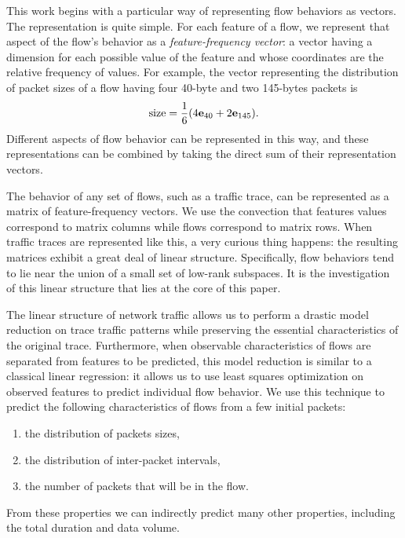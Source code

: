 \documentclass{acm_proc_article-sp}
\begin{document}
This work begins with a particular way of representing flow behaviors as vectors.
The representation is quite simple.
For each feature of a flow, we represent that aspect of the flow's behavior as a \emph{feature-frequency vector}:
a vector having a dimension for each possible value of the feature and whose coordinates are the relative frequency of values.
For example, the vector representing the distribution of packet sizes of a flow having four 40-byte and two 145-bytes packets is
\begin{align}
  \text{size} = \frac{1}{6}{\left(4\mathbf{e}_{40} + 2\mathbf{e}_{145}\right)}.
\end{align}
Different aspects of flow behavior can be represented in this way, and these representations can be combined by taking the direct sum of their representation vectors.\directsumnote

The behavior of any set of flows, such as a traffic trace, can be represented as a matrix of feature-frequency vectors.
We use the convection that features values correspond to matrix columns while flows correspond to matrix rows.
When traffic traces are represented like this, a very curious thing happens:
the resulting matrices exhibit a great deal of linear structure.
Specifically, flow behaviors tend to lie near the union of a small set of low-rank subspaces.
It is the investigation of this linear structure that lies at the core of this paper.

The linear structure of network traffic allows us to perform a drastic model reduction on trace traffic patterns while preserving the essential characteristics of the original trace.
Furthermore, when observable characteristics of flows are separated from features to be predicted, this model reduction is similar to a classical linear regression:
it allows us to use least squares optimization on observed features to predict individual flow behavior.
We use this technique to predict the following characteristics of flows from a few initial packets:
\begin{enumerate}
  \item the distribution of packets sizes,
  \item the distribution of inter-packet intervals,
  \item the number of packets that will be in the flow.
\end{enumerate}
From these properties we can indirectly predict many other properties, including the total duration and data volume.
\end{document}
